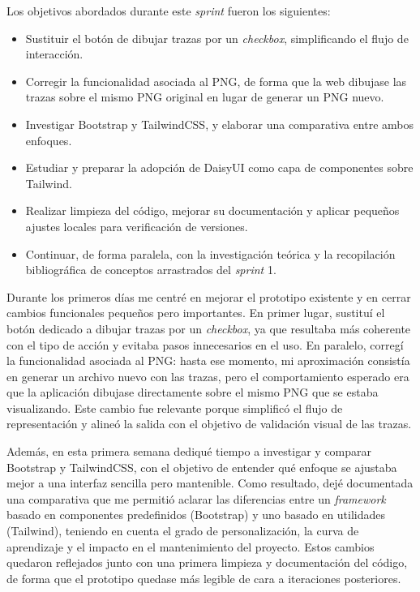 Los objetivos abordados durante este \textit{sprint} fueron los siguientes:
\begin{itemize}
	\item Sustituir el botón de dibujar trazas por un \textit{checkbox}, simplificando el flujo de interacción.
	\item Corregir la funcionalidad asociada al PNG, de forma que la web dibujase las trazas sobre el mismo PNG original en lugar de generar un PNG nuevo.
	\item Investigar Bootstrap y TailwindCSS, y elaborar una comparativa entre ambos enfoques.
	\item Estudiar y preparar la adopción de DaisyUI como capa de componentes sobre Tailwind.
	\item Realizar limpieza del código, mejorar su documentación y aplicar pequeños ajustes locales para verificación de versiones.
	\item Continuar, de forma paralela, con la investigación teórica y la recopilación bibliográfica de conceptos arrastrados del \textit{sprint} 1.
\end{itemize}

Durante los primeros días me centré en mejorar el prototipo existente y en cerrar cambios funcionales pequeños pero importantes. En primer lugar, sustituí el botón dedicado a dibujar trazas por un \textit{checkbox}, ya que resultaba más coherente con el tipo de acción y evitaba pasos innecesarios en el uso. En paralelo, corregí la funcionalidad asociada al PNG: hasta ese momento, mi aproximación consistía en generar un archivo nuevo con las trazas, pero el comportamiento esperado era que la aplicación dibujase directamente sobre el mismo PNG que se estaba visualizando. Este cambio fue relevante porque simplificó el flujo de representación y alineó la salida con el objetivo de validación visual de las trazas.

Además, en esta primera semana dediqué tiempo a investigar y comparar Bootstrap y TailwindCSS, con el objetivo de entender qué enfoque se ajustaba mejor a una interfaz sencilla pero mantenible. Como resultado, dejé documentada una comparativa que me permitió aclarar las diferencias entre un \textit{framework} basado en componentes predefinidos (Bootstrap) y uno basado en utilidades (Tailwind), teniendo en cuenta el grado de personalización, la curva de aprendizaje y el impacto en el mantenimiento del proyecto. Estos cambios quedaron reflejados junto con una primera limpieza y documentación del código, de forma que el prototipo quedase más legible de cara a iteraciones posteriores.

